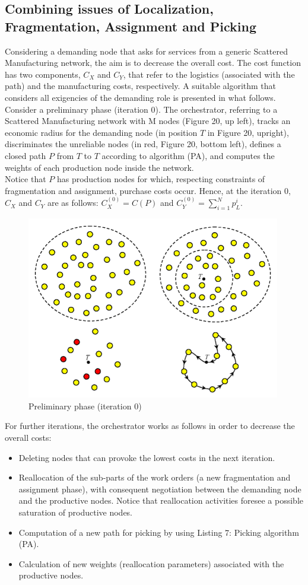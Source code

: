 \subsection{Combining issues of Localization, Fragmentation, Assignment and Picking}
Considering a demanding node that asks for services from a generic Scattered Manufacturing network, the aim is to decrease the overall cost. The cost function has two components, $C_X$ and $C_Y$, that refer to the logistics (associated with the path) and the manufacturing costs, respectively. A suitable algorithm that considers all exigencies of the demanding role is presented in what follows.\\
Consider a preliminary phase (iteration 0). The orchestrator, referring to a Scattered Manufacturing network with M nodes (Figure 20, up left), tracks an economic radius for the demanding node (in position $T$ in Figure 20, upright), discriminates the unreliable nodes (in red, Figure 20, bottom left), defines a closed path $P$ from $T$ to $T$ according to algorithm (PA), and computes the weights of each production node inside the network.\\
Notice that $P$ has production nodes for which, respecting constraints of fragmentation and assignment, purchase costs occur. Hence, at the iteration 0, $C_X$ and $C_Y$ are as follows: $C^{(0)}_X = C(P)$ and $C^{(0)}_Y=\sum^{N}_{i=1}p^i_L$.
\begin{figure}[h]
    \centering
    \includegraphics[height=8cm, keepaspectratio]{images/prelim-phase-it0}
    \caption{Preliminary phase (iteration 0)}
    \label{fig:prelim-phase-it0}
\end{figure}
For further iterations, the orchestrator works as follows in order to decrease the overall costs:
\begin{itemize}
    \item Deleting nodes that can provoke the lowest costs in the next iteration.
    \item Reallocation of the sub-parts of the work orders (a new fragmentation and assignment phase), with consequent negotiation between the demanding node and the productive nodes. Notice that reallocation activities foresee a possible saturation of productive nodes.
    \item Computation of a new path for picking by using Listing 7: Picking algorithm (PA).
    \item Calculation of new weights (reallocation parameters) associated with the productive nodes.
\end{itemize}
